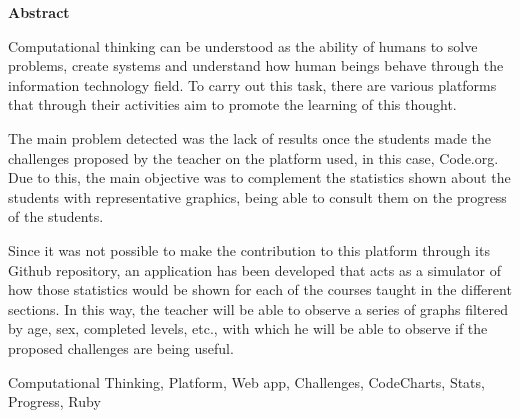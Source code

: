 \documentclass[spanish,a4paper,14pt,oneside]{extreport}
\newenvironment{summary}
  {\par\noindent\begin{center}\textbf{Abstract}\end{center}\begin{itshape}\par\noindent}
  {\end{itshape}}
\newenvironment{keywords}
  {\begin{list}{}{\setlength{\leftmargin}{1em}}\item[\hskip\labelsep \bfseries Keywords:]}
  {\end{list}}
\begin{document}
  \newpage  %
  \begin{summary}
  {\em
   
  Computational thinking can be understood as the ability of humans to solve problems, create systems and understand how human beings behave through the information technology field. 
  To carry out this task, there are various platforms that through their activities aim to promote the learning of this thought.

  The main problem detected was the lack of results once the students made the challenges proposed by the teacher on the platform used, in this case, Code.org. 
  Due to this, the main objective was to complement the statistics shown about the students with representative graphics, being able to consult them on the progress of the students.

  Since it was not possible to make the contribution to this platform through its Github repository, an application has been developed that acts as a simulator of how those statistics would be shown for each of the courses taught in the different sections. 
  In this way, the teacher will be able to observe a series of graphs filtered by age, sex, completed levels, etc., with which he will be able to observe if the proposed challenges are being useful.
  
  }
   
  \begin{keywords}
  Computational Thinking, Platform, Web app, Challenges, CodeCharts, Stats, Progress, Ruby
  \end{keywords}
   
  \end{summary}
   
  \newpage{\pagestyle{empty}}
  \thispagestyle{empty}
   
   
   
  \pagestyle{myheadings} %
   
\end{document}
